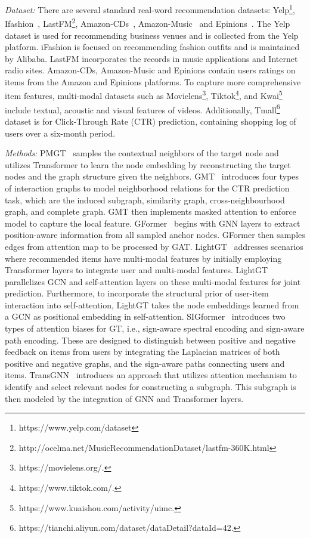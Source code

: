 \textit{Dataset:}
There are several standard real-word recommendation datasets: Yelp\footnote{https://www.yelp.com/dataset}, Ifashion~\cite{chen2019pog}, LastFM\footnote{http://ocelma.net/MusicRecommendationDataset/lastfm-360K.html}, Amazon-CDs~\cite{mcauley2013amateurs}, Amazon-Music~\cite{mcauley2013amateurs} and Epinions~\cite{tang2012etrust}. The Yelp dataset is used for recommending business venues and is collected from the Yelp platform. iFashion is focused on recommending fashion outfits and is maintained by Alibaba. LastFM incorporates the records in music applications and Internet radio sites. Amazon-CDs, Amazon-Music and Epinions contain users ratings on items from the Amazon and Epinions platforms.
To capture more comprehensive item features, multi-modal datasets such as Movielens\footnote{https://movielens.org/.}, Tiktok\footnote{https://www.tiktok.com/.}, and Kwai\footnote{https://www.kuaishou.com/activity/uimc.} include textual, acoustic and visual features of videos. Additionally, Tmall\footnote{ https://tianchi.aliyun.com/dataset/dataDetail?dataId=42.} dataset is for Click-Through Rate (CTR) prediction, containing shopping log of users over a six-month period.

\textit{Methods:} PMGT~\cite{liu2021pre} samples the contextual neighbors of the target node and utilizes Transformer to learn the node embedding by reconstructing the target nodes and the graph structure given the neighbors. GMT~\cite{min2022masked} introduces four types of interaction graphs to model neighborhood relations for the CTR prediction task, which are the induced subgraph, similarity graph, cross-neighbourhood graph, and complete graph. GMT then implements masked attention to enforce model to capture the local feature. GFormer~\cite{li2023graph} begins with GNN layers to extract position-aware information from all sampled anchor nodes. GFormer then samples edges from attention map to be processed by GAT. LightGT~\cite{wei2023lightgt} addresses scenarios where recommended items have multi-modal features by initially employing Transformer layers to integrate user and multi-modal features. LightGT parallelizes GCN and self-attention layers on these multi-modal features for joint prediction. Furthermore, to incorporate the structural prior of user-item interaction into self-attention, LightGT takes the node embeddings learned from a GCN as positional embedding in self-attention. SIGformer~\cite{chen2024sigformer} introduces two types of attention biases for GT, i.e., sign-aware spectral encoding and sign-aware path encoding. These are designed to distinguish between positive and negative feedback on items from users by integrating the Laplacian matrices of both positive and negative graphs, and the sign-aware paths connecting users and items.
TransGNN~\cite{zhang2024transgnn} introduces an approach that utilizes attention mechanism to identify and select relevant nodes for constructing a subgraph. This subgraph is then modeled by the integration of GNN and Transformer layers.





